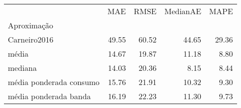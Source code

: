 \begin{tabular}{lrrrr}
\toprule
 & MAE & RMSE & MedianAE & MAPE \\
Aproximação &  &  &  &  \\
\midrule
Carneiro2016 & 49.55 & 60.52 & 44.65 & 29.36 \\
média & 14.67 & 19.87 & 11.18 & 8.80 \\
mediana & 14.03 & 20.36 & 8.15 & 8.44 \\
média ponderada consumo & 15.76 & 21.91 & 10.32 & 9.30 \\
média ponderada banda & 16.19 & 22.23 & 11.30 & 9.73 \\
\bottomrule
\end{tabular}
